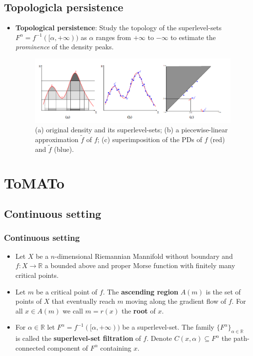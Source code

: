 \documentclass{beamer}
\theoremstyle{definition}
\newcommand{\R}{\mathbb{R}}
\begin{document}
\subsection{Topologicla persistence}
\begin{frame}
\begin{itemize}
\item \textbf{Topological persistence}: Study the topology of the superlevel-sets $F^{\alpha} = f^{-1}([\alpha,+\infty))$ as $\alpha$ ranges from $+\infty$ to $-\infty$ to estimate the \emph{prominence} of the density peaks. %
\begin{figure}
\includegraphics[scale=0.6]{density}
\caption{(a) original density and its superlevel-sets; (b) a
piecewise-linear approximation $\tilde{f}$ of $f$; (c) superimposition of the PDs of $f$ (red) and $\tilde{f}$ (blue).} %
\end{figure}
\end{itemize}
\end{frame}

\section{ToMATo}
\subsection{Continuous setting}
\begin{frame}[fragile]
\frametitle{Continuous setting}
\begin{itemize}
\item<1-> Let $X$ be a $n$-dimensional Riemannian Mannifold without boundary and $f:X\to\R$ a bounded above and proper Morse function with finitely many critical points.
\item<2-> Let $m$ be a critical point of $f$. The \textbf{ascending region} $A(m)$ is the set of points of $X$ that eventually reach $m$ moving along the gradient flow of $f$. For all $x\in A(m)$ we call $m=r(x)$ the \textbf{root} of $x$.

\item<3-> For $\alpha\in\R$ let $F^\alpha=f^{-1}([\alpha,+\infty))$ be a superlevel-set. The family $\{F^\alpha\}_{\alpha\in\R}$ is called the \textbf{superlevel-set filtration} of $f$. Denote $C(x,\alpha)\subseteq F^\alpha$ the path-connected component of $F^\alpha$ containing $x$. %
\end{itemize}
\end{frame}
\end{document}
